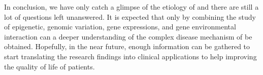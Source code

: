 \documentclass[12pt]{book}
\newcommand*{\glng}{\glsentrylong}
\begin{document}
	In conclusion, we have only catch a glimpse of the etiology of \glng{scz} and there are still a lot of questions left unanswered.
	It is expected that only by combining the study of epigenetic, genomic variation, gene expressions, and gene environmental interaction can a deeper understanding of the complex disease mechanism of \glng{scz} be obtained.
	Hopefully, in the near future, enough information can be gathered to start translating the research findings into clinical applications to help improving the quality of life of \glng{scz} patients.
	
	
	\backmatter
	\printbibliography[heading=bibintoc,title={Bibliography}]

\end{document}
